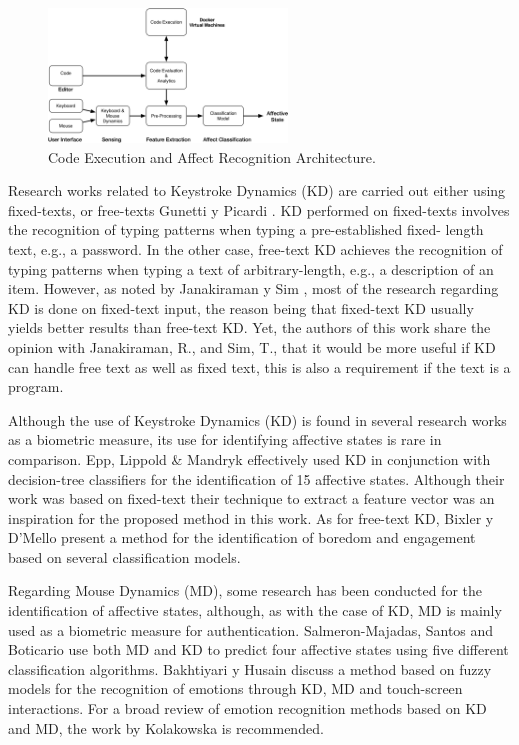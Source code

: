 \documentclass[a4paper]{llncs}
\begin{document}
\begin{figure}[!t] 
\centering 
\includegraphics[width=2.5in]{KMDAffective.png} 
\caption{Code Execution and Affect Recognition Architecture.}
\label{fig_process} 
\end{figure}


Research works related to Keystroke Dynamics (KD) are carried out either using
fixed-texts, or free-texts Gunetti y Picardi \cite{gunetti2005keystroke}.
KD performed on fixed-texts
involves the recognition of typing patterns when typing a pre-established fixed-
length text, e.g., a password. In the other case, free-text KD achieves the
recognition of typing patterns when typing a text of arbitrary-length, e.g., a
description of an item. However, as noted by Janakiraman y Sim \cite{janakiraman2007keystroke},
most of
the research regarding KD is done on fixed-text input, the reason being that
fixed-text KD usually yields better results than free-text KD. Yet, the authors
of this work share the opinion with Janakiraman, R., and Sim, T., that it would
be more useful if KD can handle free text as well as fixed text, this is also a
requirement if the text is a program.

Although the use of Keystroke Dynamics (KD) is found in several research works
as a biometric measure, its use for identifying affective states is rare in
comparison. Epp, Lippold \& Mandryk \cite{epp2011identifying} effectively used KD in conjunction
with decision-tree classifiers for the identification of 15 affective states.
Although their work was based on fixed-text their technique to extract a feature
vector was an inspiration for the proposed method in this work. As for free-text
KD, Bixler y D'Mello \cite{bixler2013detecting} present a method for the identification of boredom
and engagement based on several classification models.

Regarding Mouse Dynamics (MD), some research has been conducted for the
identification of affective states, although, as with the case of KD, MD is
mainly used as a biometric measure for authentication. Salmeron-Majadas, Santos
and Boticario \cite{salmeron2014exploring} use both MD and KD to predict four affective states using
five different classification algorithms. Bakhtiyari y Husain \cite{bakhtiyari2014fuzzy} discuss a
method based on fuzzy models for the recognition of emotions through KD, MD and
touch-screen interactions. For a broad review of emotion recognition methods
based on KD and MD, the work by Kolakowska \cite{kolakowska2013review} is recommended.
\end{document}
